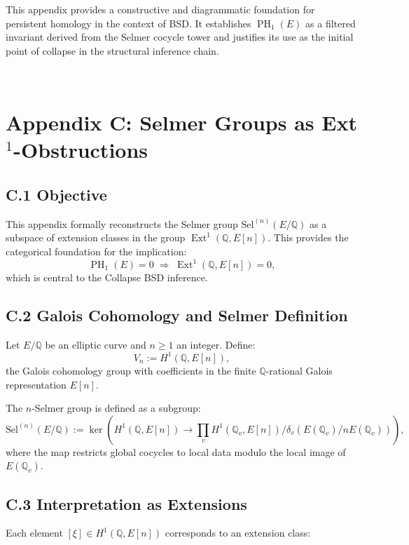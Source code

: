 \documentclass[11pt]{article}
\DeclareMathOperator{\Ext}{Ext}
\DeclareMathOperator{\PH}{PH}
\newcommand{\QQ}{\mathbb{Q}}
\begin{document}
This appendix provides a constructive and diagrammatic foundation for persistent homology in the context of BSD.  
It establishes $\PH_1(E)$ as a filtered invariant derived from the Selmer cocycle tower and justifies its use as the initial point of collapse in the structural inference chain.




\section*{Appendix C: Selmer Groups as Ext$^1$-Obstructions}

\subsection*{C.1 Objective}

This appendix formally reconstructs the Selmer group $\mathrm{Sel}^{(n)}(E/\QQ)$ as a subspace of extension classes in the group $\Ext^1(\QQ,E[n])$.  
This provides the categorical foundation for the implication:
\[
\PH_1(E) = 0 \;\Rightarrow\; \Ext^1(\QQ,E[n]) = 0,
\]
which is central to the Collapse BSD inference.

\subsection*{C.2 Galois Cohomology and Selmer Definition}

Let $E/\QQ$ be an elliptic curve and $n \geq 1$ an integer.  
Define:
\[
V_n := H^1(\QQ,E[n]),
\]
the Galois cohomology group with coefficients in the finite $\QQ$-rational Galois representation $E[n]$.

The $n$-Selmer group is defined as a subgroup:
\[
\mathrm{Sel}^{(n)}(E/\QQ) := \ker \left( H^1(\QQ, E[n]) \to \prod_v H^1(\QQ_v, E[n]) / \delta_v(E(\QQ_v)/nE(\QQ_v)) \right),
\]
where the map restricts global cocycles to local data modulo the local image of $E(\QQ_v)$.

\subsection*{C.3 Interpretation as Extensions}

Each element $[\xi] \in H^1(\QQ,E[n])$ corresponds to an extension class:
\end{document}
